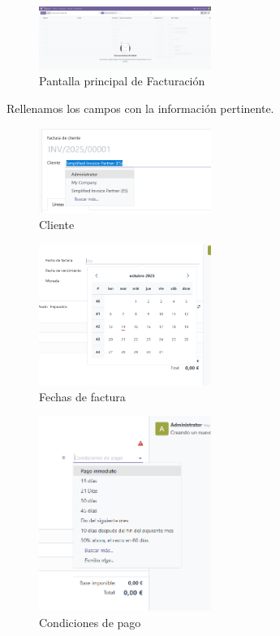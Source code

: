 \documentclass[a4paper,12pt]{article}
\begin{document}
\begin{figure}[h!]
    \centering
    \includegraphics[width=0.5\textwidth]{pr2odoo02-facturacMain.png}
    \caption{Pantalla principal de Facturación}
\end{figure}
\FloatBarrier

Rellenamos los campos con la información pertinente.

\begin{figure}[h!]
    \centering
    \includegraphics[width=0.5\textwidth]{pr2odoo03-facturac01.png}
    \caption{Cliente}
\end{figure}
\FloatBarrier

\begin{figure}[h!]
    \centering
    \includegraphics[width=0.5\textwidth]{pr2odoo04-facturac02.png}
    \caption{Fechas de factura}
\end{figure}
\FloatBarrier

\begin{figure}[h!]
    \centering
    \includegraphics[width=0.5\textwidth]{pr2odoo05-facturac03.png}
    \caption{Condiciones de pago}
\end{figure}
\FloatBarrier
\end{document}
